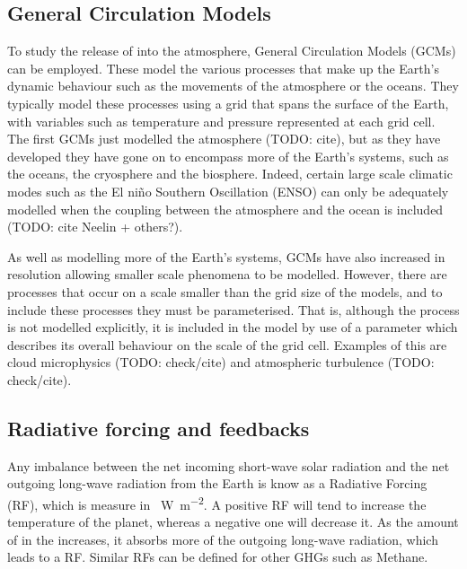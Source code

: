 \documentclass{article}
\begin{document}
\subsection{General Circulation Models}
To study the release of  into the atmosphere, General Circulation Models (GCMs) can be employed. These model the various processes that make up the Earth's dynamic behaviour such as the movements of the atmosphere or the oceans. They typically model these processes using a grid that spans the surface of the Earth, with variables such as temperature and pressure represented at each grid cell. The first GCMs just modelled the atmosphere (TODO: cite), but as they have developed they have gone on to encompass more of the Earth's systems, such as the oceans, the cryosphere and the biosphere. Indeed, certain large scale climatic modes such as the El ni{\~n}o Southern Oscillation (ENSO) can only be adequately modelled when the coupling between the atmosphere and the ocean is included (TODO: cite Neelin + others?). 

As well as modelling more of the Earth's systems, GCMs have also increased in resolution allowing smaller scale phenomena to be modelled. However, there are processes that occur on a scale smaller than the grid size of the models, and to include these processes they must be parameterised. That is, although the process is not modelled explicitly, it is included in the model by use of a parameter which describes its overall behaviour on the scale of the grid cell. Examples of this are cloud microphysics (TODO: check/cite) and atmospheric turbulence (TODO: check/cite).

\subsection{Radiative forcing and feedbacks}
Any imbalance between the net incoming short-wave solar radiation and the net outgoing long-wave radiation from the Earth is know as a Radiative Forcing (RF), which is measure in \SI{}{W.m^{-2}}. A positive RF will tend to increase the temperature of the planet, whereas a negative one will decrease it. As the amount of  in the increases, it absorbs more of the outgoing long-wave radiation, which leads to a RF. Similar RFs can be defined for other GHGs such as Methane.
\end{document}
